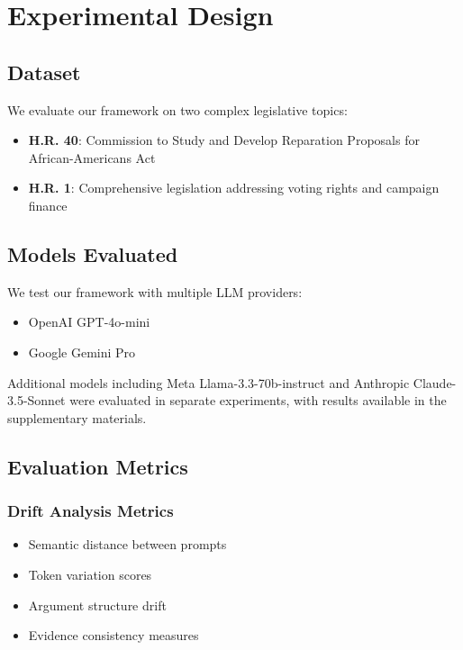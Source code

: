 \documentclass[11pt]{article}
\begin{document}
\section{Experimental Design}

\subsection{Dataset}

We evaluate our framework on two complex legislative topics:
\begin{itemize}
    \item \textbf{H.R. 40}: Commission to Study and Develop Reparation Proposals for African-Americans Act
    \item \textbf{H.R. 1}: Comprehensive legislation addressing voting rights and campaign finance
\end{itemize}

\subsection{Models Evaluated}

We test our framework with multiple LLM providers:
\begin{itemize}
    \item OpenAI GPT-4o-mini
    \item Google Gemini Pro
\end{itemize}

Additional models including Meta Llama-3.3-70b-instruct and Anthropic Claude-3.5-Sonnet were evaluated in separate experiments, with results available in the supplementary materials.

\subsection{Evaluation Metrics}

\subsubsection{Drift Analysis Metrics}
\begin{itemize}
    \item Semantic distance between prompts
    \item Token variation scores
    \item Argument structure drift
    \item Evidence consistency measures
\end{itemize}
\end{document}
